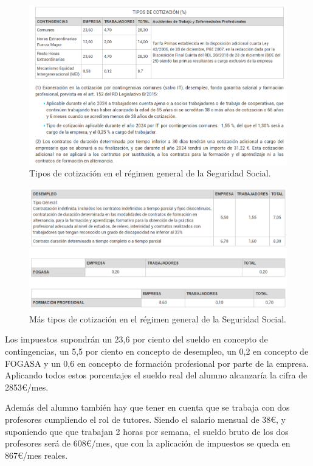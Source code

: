 \begin{figure}
    \centering
    \includegraphics[width=1\linewidth]{img/cotizacion1.png}
    \caption{Tipos de cotización en el régimen general de la Seguridad Social.}
    \label{fig:coti1}
\end{figure}

\begin{figure}
    \centering
    \includegraphics[width=1\linewidth]{img/cotizacion2.png}
    \caption{Más tipos de cotización en el régimen general de la Seguridad Social.}
    \label{fig:coti2}
\end{figure}

Los impuestos supondrán un 23,6 por ciento del sueldo en concepto de contingencias, un 5,5 por ciento en concepto de desempleo, un 0,2 en concepto de FOGASA y un 0,6 en concepto de formación profesional por parte de la empresa. Aplicando todos estos porcentajes el sueldo real del alumno alcanzaría la cifra de 2853€/mes.

Además del alumno también hay que tener en cuenta que se trabaja con dos profesores cumpliendo el rol de tutores. Siendo el salario mensual de 38€, y suponiendo que que trabajan 2 horas por semana, el sueldo bruto de los dos profesores será de 608€/mes, que con la aplicación de impuestos se queda en 867€/mes reales.

